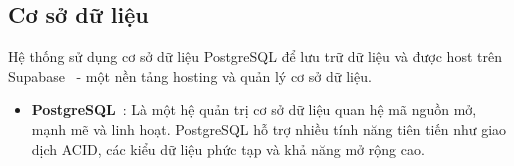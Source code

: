\subsection{Cơ sở dữ liệu}

Hệ thống sử dụng cơ sở dữ liệu PostgreSQL để lưu trữ dữ liệu và được host trên Supabase~\cite{supabasedoc} - một nền tảng hosting và quản lý cơ sở dữ liệu.
\begin{itemize}
    \item \textbf{PostgreSQL}~\cite{postgresqldoc}: Là một hệ quản trị cơ sở dữ liệu quan hệ mã nguồn mở, mạnh mẽ và linh hoạt. PostgreSQL hỗ trợ nhiều tính năng tiên tiến như giao dịch ACID, các kiểu dữ liệu phức tạp và khả năng mở rộng cao.
\end{itemize}